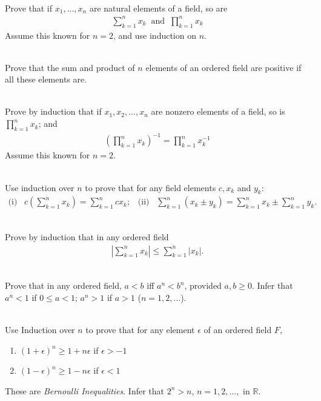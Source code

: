 \documentclass[12pt]{book}
\newcommand{\e}{\epsilon}
\theoremstyle{definition}
\begin{document}
\begin{ex}[2] 
\\
Prove that if $x_1,\ldots, x_n$ are natural elements of a field, so are
\begin{align*}
	\sum_{k=1}^n x_k \;\; \text{and}\;\; \prod_{k=1}^{n}x_k
\end{align*}	
Assume this known for $n=2$, and use induction on $n$. 
\end{ex}
\begin{ex}[3]
\\
Prove that the sum and product of $n$ elements of an ordered field are positive if all these elements are.
\end{ex}
\begin{ex}[4]
\\
Prove by induction that if $x_1, x_2, \ldots, x_n$ are nonzero elements of a field, so is $\prod_{k=1}^n x_k$; and
\begin{align*}
	\left(\prod_{k=1}^n x_k \right)^{-1} = \prod_{k=1}^n x_k^{-1}	
\end{align*}
 Assume this known for $n=2$.
\end{ex}
\begin{ex}[5]
\\
Use induction over $n$ to prove that for any field elements $c, x_k$ and $y_k$:
\begin{align*}
	\text{(i)}\;\;\; c\left(\sum_{k=1}^n x_k \right) = \sum_{k=1}^n cx_k;\;\;\; \text{(ii)}\;\;\; \sum_{k=1}^n (x_k\pm y_k) = \sum_{k=1}^n x_k \pm \sum_{k=1}^n y_k.   
\end{align*}
\end{ex}
\begin{ex}[6]
\\
Prove by induction that in any ordered field
\begin{align*}
	\left| \sum_{k=1}^n x_k \right| \leq \sum_{k=1}^n |x_k|.
\end{align*}	
\end{ex}
\begin{ex}[7]
\\
Prove that in any ordered field, $a<b$ iff $a^n < b^n$, provided $a,b \geq 0$. Infer that $a^n < 1$ if $0 \leq a <1$; $a^n >1$ if $a>1$ ($n=1,2,\ldots$).	
\end{ex}
\begin{ex}[8]
\\
Use Induction over $n$ to prove that for any element $\e$ of an ordered field $F$, 
\begin{enumerate}[label=(\roman*)]
	\item $(1+\e)^n \geq 1 +n\e$ if $\e >-1$
	\item $(1-\e)^n \geq 1 -n\e $ if $\e <1$ 
\end{enumerate}
These are \textit{Bernoulli Inequalities}. Infer that $2^n >n$, $n=1,2,\ldots,$ in $\mathbb{R}$.	
\end{ex}
\end{document}
